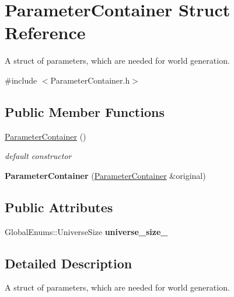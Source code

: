 \hypertarget{struct_parameter_container}{\section{Parameter\-Container Struct Reference}
\label{struct_parameter_container}
}


A struct of parameters, which are needed for world generation.  




{\ttfamily \#include $<$Parameter\-Container.\-h$>$}

\subsection*{Public Member Functions}
\begin{DoxyCompactItemize}
\item 
\hyperlink{struct_parameter_container_aeade9cd5e5c1922cbfdd6147d16090f9}{Parameter\-Container} ()
\begin{DoxyCompactList}\small\item\em default constructor \end{DoxyCompactList}\item 
\hypertarget{struct_parameter_container_ac7fa0076a1a8aa5c256640922ac1983f}{{\bfseries Parameter\-Container} (\hyperlink{struct_parameter_container}{Parameter\-Container} \&original)}\label{struct_parameter_container_ac7fa0076a1a8aa5c256640922ac1983f}

\end{DoxyCompactItemize}
\subsection*{Public Attributes}
\begin{DoxyCompactItemize}
\item 
Global\-Enums\-::\-Universe\-Size {\bfseries universe\-\_\-size\-\_\-}
\end{DoxyCompactItemize}


\subsection{Detailed Description}
A struct of parameters, which are needed for world generation. 

